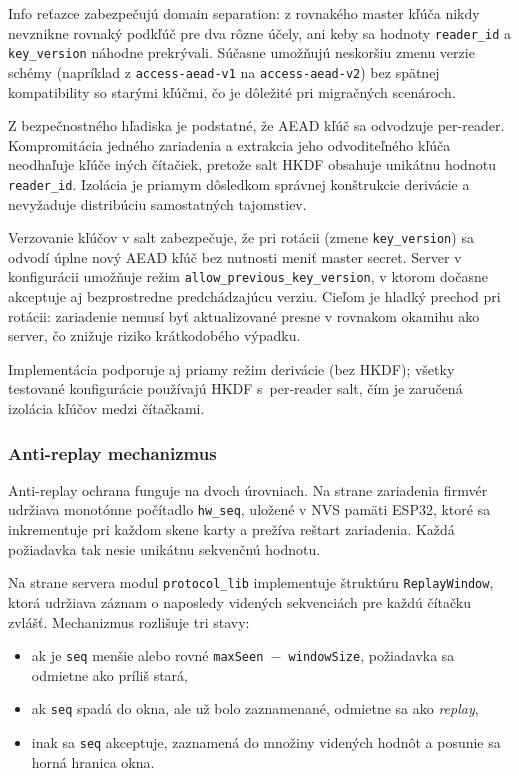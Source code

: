 Info reťazce zabezpečujú domain separation\cite{RFC5869}: z rovnakého master kľúča nikdy nevznikne rovnaký podkľúč pre dva rôzne účely, ani keby sa hodnoty \texttt{reader\_id} a \texttt{key\_version} náhodne prekrývali. Súčasne umožňujú neskoršiu zmenu verzie schémy (napríklad z \texttt{access-aead-v1} na \texttt{access-aead-v2}) bez spätnej kompatibility so starými kľúčmi, čo je dôležité pri migračných scenároch.

Z bezpečnostného hľadiska je podstatné, že AEAD kľúč sa odvodzuje per-reader. Kompromitácia jedného zariadenia a extrakcia jeho odvoditeľného kľúča neodhaľuje kľúče iných čítačiek, pretože salt HKDF obsahuje unikátnu hodnotu \texttt{reader\_id}. Izolácia je priamym dôsledkom správnej konštrukcie derivácie a nevyžaduje distribúciu samostatných tajomstiev.

Verzovanie kľúčov v salt zabezpečuje, že pri rotácii (zmene \texttt{key\_version}) sa odvodí úplne nový AEAD kľúč bez nutnosti meniť master secret. Server v konfigurácii umožňuje režim \texttt{allow\_previous\_key\_version}, v ktorom dočasne akceptuje aj bezprostredne predchádzajúcu verziu. Cieľom je hladký prechod pri rotácii: zariadenie nemusí byť aktualizované presne v rovnakom okamihu ako server, čo znižuje riziko krátkodobého výpadku\cite{NIST80057}.

Implementácia podporuje aj priamy režim derivácie (bez HKDF); všetky testované konfigurácie používajú HKDF s~per-reader salt, čím je zaručená izolácia kľúčov medzi čítačkami.

\subsubsection{Anti-replay mechanizmus}

Anti-replay ochrana funguje na dvoch úrovniach. Na strane zariadenia firmvér udržiava monotónne počítadlo \texttt{hw\_seq}, uložené v NVS pamäti ESP32, ktoré sa inkrementuje pri každom skene karty a prežíva reštart zariadenia. Každá požiadavka tak nesie unikátnu sekvenčnú hodnotu.

Na strane servera modul \texttt{protocol\_lib} implementuje štruktúru \texttt{ReplayWindow}, ktorá udržiava záznam o naposledy videných sekvenciách pre každú čítačku zvlášť. Mechanizmus rozlišuje tri stavy:

\begin{itemize}[leftmargin=*,itemsep=2pt]
  \item ak je \texttt{seq} menšie alebo rovné \texttt{maxSeen $-$ windowSize}, požiadavka sa odmietne ako príliš stará,
  \item ak \texttt{seq} spadá do okna, ale už bolo zaznamenané, odmietne sa ako \emph{replay},
  \item inak sa \texttt{seq} akceptuje, zaznamená do množiny videných hodnôt a posunie sa horná hranica okna.
\end{itemize}

